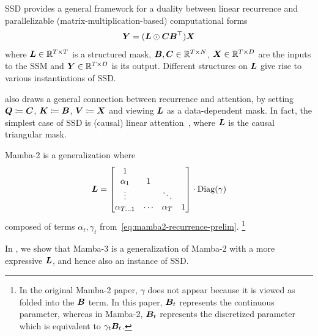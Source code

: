 SSD provides a general framework for a duality between linear recurrence and parallelizable (matrix-multiplication-based) computational forms
\begin{align}
    {\bm{Y}} 
    =
    (   {\bm{L}}
        \odot 
        {\bm{C}} {{\bm{B}}}^{\top}
    ){\bm{X}}
    \label{eq:ssd}
\end{align}
where ${\bm{L}} \in \mathbb{R}^{T \times T}$ is a structured mask,
${\bm{B}},{\bm{C}} \in \mathbb{R}^{T \times N}$, ${\bm{X}} \in \mathbb{R}^{T \times D}$ are the inputs to the SSM and ${\bm{Y}} \in \mathbb{R}^{T \times D}$ is its output.
Different structures on ${\bm{L}}$ give rise to various instantiations of SSD.

 also draws a general connection between recurrence and attention, 
by setting ${\bm{Q}}\coloneqq{\bm{C}}$, ${\bm{K}}\coloneqq{\bm{B}}$, ${\bm{V}}\coloneqq{\bm{X}}$ and viewing ${\bm{L}}$ as a data-dependent mask.
In fact, the simplest case of SSD is (causal) linear attention~\citep{linearattention}, where ${\bm{L}}$ is the causal triangular mask.

Mamba-2 is a generalization where
\begin{align}
    {\bm{L}}
    =
        \begin{bmatrix}
            1 \\
            \alpha_1 & 1 \\
            \vdots & & \ddots \\
            \alpha_{T...1} & \cdots & \alpha_T & 1
        \end{bmatrix}
        \cdot
        \operatorname*{Diag}(\gamma)
    \label{eq:mamba2-mask}
\end{align}
composed of terms $\alpha_t, \gamma_t$ from~\eqref{eq:mamba2-recurrence-prelim}.%
\footnote{In the original Mamba-2 paper, $\gamma$ does not appear because it is viewed as folded into the ${\bm{B}}$ term. In this paper, ${\bm{B}}_t$ represents the continuous parameter, whereas in Mamba-2, ${\bm{B}}_t$ represents the discretized parameter which is equivalent to $\gamma_t {\bm{B}}_t$.}

In , we show that Mamba-3 is a generalization of Mamba-2 with a more expressive ${\bm{L}}$, and hence also an instance of SSD.
